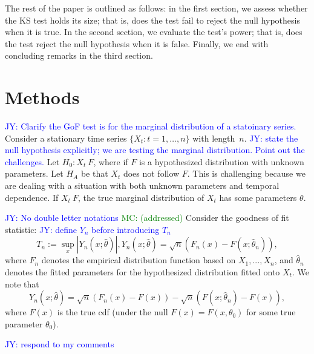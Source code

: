 \documentclass[12pt, letterpaper]{article}
\newcommand{\jy}[1]{\textcolor{blue}{JY: #1}}
\newcommand{\mc}[1]{\textcolor{green}{MC: (#1)}}
\begin{document}
The rest of the paper is outlined as follows: in the first 
section, we assess whether the KS
test holds its size; that is, does the test fail to reject the null hypothesis
when it is true. In the second section, we evaluate the 
test's power; that is, does the test reject the null hypothesis when it is 
false.
Finally, we end with 
concluding remarks in the third section.


\section{Methods}
\label{sec:methods}

\jy{Clarify the GoF test is for the marginal distribution of a statoinary
  series.}
Consider a stationary time series $\{X_t: t = 1, \ldots, n\}$ with length~$n$.
\jy{state the null hypothesis explicitly; we are testing the marginal
  distribution. Point out the challenges.}
Let $H_0: X_t ~ F$, where if $F$ is a hypothesized distribution with unknown 
parameters. Let $H_A$ be that $X_t$ does not follow $F$. This is challenging because we are
dealing with a situation with both unknown parameters and temporal dependence.
If $X_t ~ F$, the true marginal distribution of $X_t$ has some parameters 
$\theta$.



\jy{No double letter notations}
\mc{addressed}
Consider the goodness of fit statistic:
\jy{define $Y_n$ before introducing $T_n$}
\begin{equation*}
  T_n := \sup_x|Y_n(x; \hat\theta)|, 
Y_n(x; \hat\theta) = \sqrt{n}(F_n(x) - F(x; \hat\theta_n)),
\end{equation*}
where $F_n$ denotes the empirical distribution function based on $X_1,...,X_n$,
and $\hat\theta_n$ denotes the fitted parameters for the hypothesized 
distribution fitted onto $X_t$.
We note that
\begin{equation*}
Y_n(x; \hat\theta) = \sqrt{n}(F_n(x) - F(x)) - 
\sqrt{n}(F(x; \hat\theta_n) - F(x)),
\end{equation*}
where $F(x)$ is the true cdf (under the null $F(x) = F(x, \theta_0)$ for some
true parameter $\theta_0$).

\jy{respond to my comments}
\end{document}
